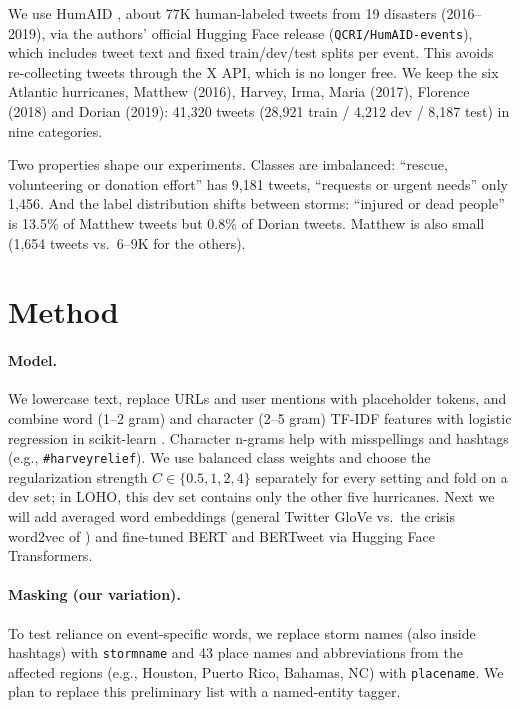 \documentclass[11pt,a4paper]{article}
\begin{document}
We use HumAID \citep{alam2021humaid}, about 77K human-labeled tweets from 19 disasters (2016--2019), via the authors' official Hugging Face release (\texttt{QCRI/HumAID-events}), which includes tweet text and fixed train/dev/test splits per event. This avoids re-collecting tweets through the X API, which is no longer free. We keep the six Atlantic hurricanes, Matthew (2016), Harvey, Irma, Maria (2017), Florence (2018) and Dorian (2019): 41,320 tweets (28,921 train / 4,212 dev / 8,187 test) in nine categories.

Two properties shape our experiments. Classes are imbalanced: ``rescue, volunteering or donation effort'' has 9,181 tweets, ``requests or urgent needs'' only 1,456. And the label distribution shifts between storms: ``injured or dead people'' is 13.5\% of Matthew tweets but 0.8\% of Dorian tweets. Matthew is also small (1,654 tweets vs.\ 6--9K for the others).

\section{Method}

\paragraph{Model.} We lowercase text, replace URLs and user mentions with placeholder tokens, and combine word (1--2 gram) and character (2--5 gram) TF-IDF features with logistic regression in scikit-learn \citep{pedregosa2011sklearn}. Character n-grams help with misspellings and hashtags (e.g., \texttt{\#harveyrelief}). We use balanced class weights and choose the regularization strength $C \in \{0.5, 1, 2, 4\}$ separately for every setting and fold on a dev set; in LOHO, this dev set contains only the other five hurricanes. Next we will add averaged word embeddings (general Twitter GloVe vs.\ the crisis word2vec of \citealp{imran2016lifeline}) and fine-tuned BERT \citep{devlin2019bert} and BERTweet \citep{nguyen2020bertweet} via Hugging Face Transformers.

\paragraph{Masking (our variation).} To test reliance on event-specific words, we replace storm names (also inside hashtags) with \texttt{stormname} and 43 place names and abbreviations from the affected regions (e.g., Houston, Puerto Rico, Bahamas, NC) with \texttt{placename}. We plan to replace this preliminary list with a named-entity tagger.
\end{document}
